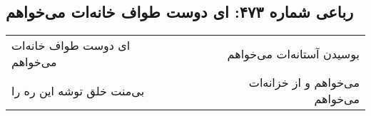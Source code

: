 \begin{center}
\section*{رباعی شماره ۴۷۳: ای دوست طواف خانه‌ات می‌خواهم}
\label{sec:sh473}
\begin{longtable}{l p{0.5cm} r}
ای دوست طواف خانه‌ات می‌خواهم
&&
بوسیدن آستانه‌ات می‌خواهم
\\
بی‌منت خلق توشه این ره را
&&
می‌خواهم و از خزانه‌ات می‌خواهم
\\
\end{longtable}
\end{center}
